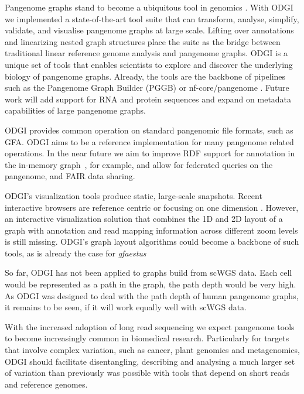 \documentclass{bioinfo}
\begin{document}
Pangenome graphs stand to become a ubiquitous tool in genomics \citep{Eizenga_2020}. With ODGI we implemented a state-of-the-art tool suite that can transform, analyse, simplify, validate, and visualise pangenome graphs at large scale.
%
Lifting over annotations and linearizing nested graph structures place the suite as the bridge between traditional linear reference genome analysis and pangenome graphs. ODGI is a unique set of tools that enables scientists to explore and discover the underlying biology of pangenome graphs. Already, the tools are the backbone of pipelines such as the Pangenome Graph Builder \citep{pggb} (PGGB) or nf-core/pangenome \citep{pangenome}. %
Future work will add support for RNA and protein sequences and expand on metadata capabilities of large pangenome graphs.

ODGI provides common operation on standard pangenomic file formats, such as GFA. ODGI aims to be a reference implementation for many pangenome related operations. In the near future we aim to improve RDF support for annotation in the in-memory graph~\citep{Yokoyama2020}, for example, and allow for federated queries on the pangenome, and FAIR data sharing.

ODGI's visualization tools produce static, large-scale snapshots. Recent interactive browsers are reference centric \citep{Beyer2019, Yokoyama2019, Durant2021, Liang2021} or focusing on one dimension \citep{Wick_2015, Gonnella2018}. However, an interactive visualization solution that combines the 1D and 2D layout of a graph with annotation and read mapping information across different zoom levels is still missing. ODGI's graph layout algorithms could become a backbone of such tools, as is already the case for \textit{gfaestus} \citep{gfaestus}%

So far, ODGI has not been applied to graphs build from scWGS \citep{Zhuo2021} data. Each cell would be represented as a path in the graph, the path depth would be very high. As ODGI was designed to deal with the path depth of human pangenome graphs, it remains to be seen, if it will work equally well with scWGS data.

With the increased adoption of long read sequencing we expect pangenome tools to become increasingly common in biomedical research. Particularly for targets that involve complex variation, such as cancer, plant genomics and metagenomics, ODGI should facilitate disentangling, describing and analysing a much larger set of variation than previously was possible with tools that depend on short reads and reference genomes.
\end{document}
